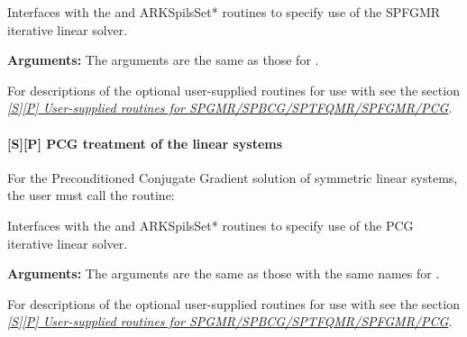 \documentclass[letterpaper,10pt,english]{sphinxmanual}
\begin{document}
\begin{fulllineitems}
\label{f_interface/Usage:f/_/FARKSPFGMR}
Interfaces with the {\hyperref[c_interface/User_callable:ARKSpfgmr]{}} and
ARKSpilsSet* routines to specify use of the SPFGMR iterative
linear solver.

\textbf{Arguments:}  The arguments are the same as those for
{\hyperref[f_interface/Usage:f/_/FARKSPGMR]{}}.

\end{fulllineitems}


For descriptions of the optional user-supplied routines for use with
{\hyperref[f_interface/Usage:f/_/FARKSPFGMR]{}} see the section {\hyperref[f_interface/Usage:finterface-spilsusersupplied]{\emph{{[}S{]}{[}P{]} User-supplied routines for SPGMR/SPBCG/SPTFQMR/SPFGMR/PCG}}}.


\paragraph{{[}\textbf{S}{]}{[}\textbf{P}{]} PCG treatment of the linear systems}
\label{f_interface/Usage:s-p-pcg-treatment-of-the-linear-systems}
For the Preconditioned Conjugate Gradient solution of symmetric linear
systems, the user must call the {\hyperref[f_interface/Usage:f/_/FARKPCG]{}} routine:

\begin{fulllineitems}
\label{f_interface/Usage:f/_/FARKPCG}
Interfaces with the {\hyperref[c_interface/User_callable:ARKPcg]{}} and
ARKSpilsSet* routines to specify use of the PCG iterative
linear solver.

\textbf{Arguments:}  The arguments are the same as those with the
same names for {\hyperref[f_interface/Usage:f/_/FARKSPGMR]{}}.

\end{fulllineitems}


For descriptions of the optional user-supplied routines for use with
{\hyperref[f_interface/Usage:f/_/FARKPCG]{}} see the section {\hyperref[f_interface/Usage:finterface-spilsusersupplied]{\emph{{[}S{]}{[}P{]} User-supplied routines for SPGMR/SPBCG/SPTFQMR/SPFGMR/PCG}}}.
\end{document}
